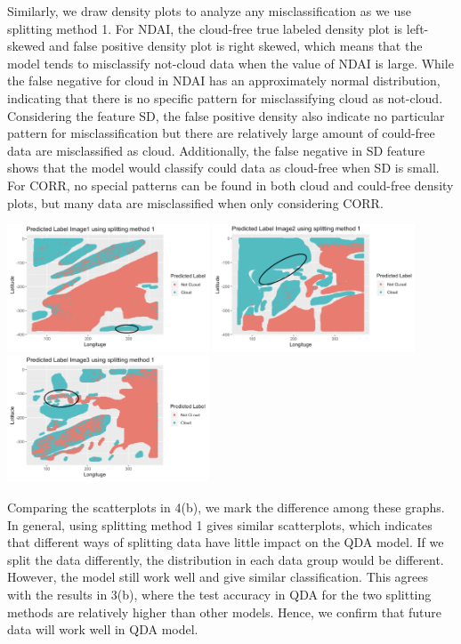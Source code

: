 \documentclass[11pt]{article}
\begin{document}
Similarly, we draw density plots to analyze any misclassification as we use splitting method 1. For NDAI, the cloud-free true labeled density plot is left-skewed and false positive density plot is right skewed, which means that the model tends to misclassify not-cloud data when the value of NDAI is large. While the false negative for cloud in NDAI has an approximately normal distribution, indicating that there is no specific pattern for misclassifying cloud as not-cloud. Considering the feature SD, the false positive density also indicate no particular pattern for misclassification but there are relatively large amount of could-free data are misclassified as cloud. Additionally, the false negative in SD feature shows that the model would classify could data as cloud-free when SD  is  small. For CORR, no special patterns can be found in  both cloud and could-free density plots, but many data are misclassified when only considering CORR. 

\includegraphics[width = 6cm]{4(d)image1}
\includegraphics[width = 6cm]{4(d)image2}
\includegraphics[width = 6cm]{4(d)image3}

Comparing the scatterplots in 4(b), we mark the difference among these graphs. In general, using splitting method 1 gives similar scatterplots, which indicates that different ways of splitting data have little impact on the QDA model. If we split the data differently, the distribution in each data group would be different. However, the model still work well and give similar classification. This agrees with the results in 3(b), where the test accuracy in QDA for the two splitting methods are relatively higher than other models. Hence, we confirm that future data will work well in QDA model. 
\end{document}
